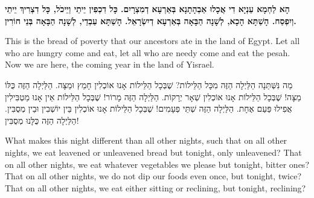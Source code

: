 

{\bfseries
הָא לַחְמָא עַנְיָא דִי אֲכָלוּ אַבְהָתָנָא בְּאַרְעָא דְמִצְרָיִם. כָּל דִכְפִין יֵיתֵי וְיֵיכֹל, כָּל דִצְרִיךְ יֵיתֵי וְיִפְסַח. הָשַׁתָּא הָכָא, לְשָׁנָה הַבָּאָה בְּאַרְעָא דְיִשְׂרָאֵל. הָשַׁתָּא עַבְדֵי, לְשָׁנָה הַבָּאָה בְּנֵי חוֹרִין.
}

\begin{english}
This is the bread of poverty that our ancestors ate in the land of Egypt. Let all who are hungry come and eat, let all who are needy come and eat the pesah. Now we are here, the coming year in the land of Yisrael.
\end{english}

\vspace{1em}



מַה נִּשְּׁתַּנָה הַלַּיְלָה הַזֶּה מִכָּל הַלֵּילוֹת? 
שֶׁבְּכָל הַלֵּילוֹת אָנוּ אוֹכְלִין חָמֵץ וּמַצָּה. הַלַּיְלָה הַזֶּה כֻּלּוֹ מַצָּה!
שֶׁבְּכָל הַלֵּילוֹת אָנוּ אוֹכְלִין שְׁאָר יְרָקוֹת. הַלַּיְלָה הַזֶּה מָרוֹר!
שֶׁבְּכָל הַלֵּילוֹת אֵין אָנוּ מַטְבִּילִין אֲפִילוּ פַּעַם אֶחָת. הַלַּיְלָה הַזֶּה שְׁתֵּי פְעָמִים!
שֶׁבְּכָל הַלֵּילוֹת אָנוּ אוֹכְלִין בֵּין יוֹשְׁבִין וּבֵין מְסֻבִּין. הַלַּיְלָה הַזֶּה כֻּלָּנוּ מְסֻבִּין!

\begin{english}
What makes this night different than all other nights, such that on all other nights, we eat leavened or unleavened bread but tonight, only unleavened? That on all other nights, we eat whatever vegetables we please but tonight, bitter ones? That on all other nights, we do not dip our foods even once, but tonight, twice? That on all other nights, we eat either sitting or reclining, but tonight, reclining?
\end{english}

\vspace{1em}



